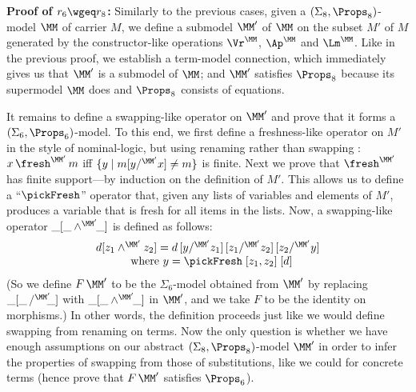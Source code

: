 		\textbf{Proof of $r_6 \wgeq r_8$:}  
		Similarly to the previous cases, 
		given a $(\Sigma_8,\Props_8)$-model $\MM$ of carrier $M$, we 
		define a submodel $\MM'$ of $\MM$ on the subset $M'$ of $M$ generated by the constructor-like operations $\Vr^\MM$, $\Ap^\MM$ and $\Lm^\MM$. 
		Like in the previous proof, we establish a term-model connection, which immediately gives us that $\MM'$ is a submodel of $\MM$; and $\MM'$ satisfies $\Props_8$ because its supermodel $\MM$ does and $\Props_8$ consists of equations. 
		
		It remains to define a swapping-like operator on $\MM'$ and prove that it forms a $(\Sigma_6,\Props_6)$-model. To this end, we first define 
		a freshness-like operator on $M'$ in the style of nominal-logic, but using renaming rather than swapping \cite{DBLP:conf/cade/Popescu22}: $x\,\fresh^{\MM'}\,m$ iff $\{y \mid m[y/^{\MM'}x] \not= m\}$ is finite. 
		Next we prove that $\fresh^{\MM'}$ has finite support---by induction on the definition of $M'$. This allows us to define a ``$\pickFresh$'' 
		operator that, given any lists of variables and elements of $M'$, produces a variable that is fresh for all items in the lists. 
		Now, a swapping-like operator $\_[\_\wedge^{\MM'}\!\!\_]$ is defined as follows: 
		$$
		\begin{array}{c} 
		d[z_1 \wedge^{\MM'} z_2] = 
		d\,[y /^{\MM'} z_1]\,[z_1 /^{\MM'} z_2]\,[z_2 /^{\MM'} y]
		\\
		\mbox{ \ where $y = \pickFresh\;[z_1,z_2]\;[d]$} 
		\end{array} 
		$$
		(So we define $F\,\MM'$ to be the $\Sigma_6$-model obtained from $\MM'$ by replacing $\_[\_\,/^{\MM'}\!\!\_]$ with $\_[\_\wedge^{\MM'}\!\!\_]$ in $\MM'$, and we take $F$ to be the identity on morphisms.) 
		In other words, the definition proceeds just like we would define swapping from renaming on terms. 
		Now the only question is whether we have enough assumptions on our abstract $(\Sigma_8,\Props_8)$-model $\MM'$ in order to infer the properties of swapping from those of substitutions, like we could for concrete terms (hence prove that $F\,\MM'$ 
		satisfies $\Props_6$). 
		
